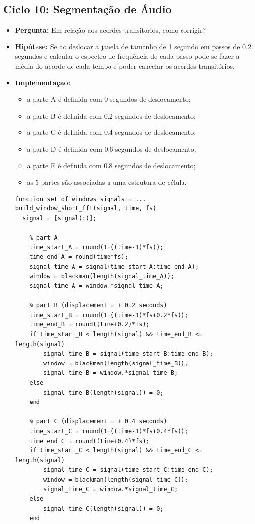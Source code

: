 \subsection{Ciclo 10: Segmentação de Áudio}
\label{subsec:ciclo_10}
\begin{itemize}
\item \textbf{Pergunta:} Em relação aos acordes transitórios, como corrigir?
\item \textbf{Hipótese:} Se ao deslocar a janela de tamanho de 1 segundo em passos de 0.2 segundos e calcular o espectro de frequência de cada passo pode-se fazer a média do acorde de cada tempo e poder cancelar os acordes transitórios.
\item \textbf{Implementação:}
\begin{itemize} 
	\item a parte A é definida com 0 segundos de deslocamento;
	\item a parte B é definida com 0.2 segundos de deslocamento;
	\item a parte C é definida com 0.4 segundos de deslocamento;
	\item a parte D é definida com 0.6 segundos de deslocamento;
	\item a parte E é definida com 0.8 segundos de deslocamento;
	\item as 5 partes são associadas a uma estrutura de célula.
\end{itemize}
\begin{lstlisting}
function set_of_windows_signals = ...
build_window_short_fft(signal, time, fs)
  signal = [signal(:)];

    % part A
    time_start_A = round(1+((time-1)*fs));
    time_end_A = round(time*fs);
    signal_time_A = signal(time_start_A:time_end_A);
    window = blackman(length(signal_time_A));
    signal_time_A = window.*signal_time_A;

    % part B (displacement = + 0.2 seconds)
    time_start_B = round(1+((time-1)*fs+0.2*fs));
    time_end_B = round((time+0.2)*fs);
    if time_start_B < length(signal) && time_end_B <= length(signal)
        signal_time_B = signal(time_start_B:time_end_B);
        window = blackman(length(signal_time_B));
        signal_time_B = window.*signal_time_B;
    else
        signal_time_B(length(signal)) = 0;
    end

    % part C (displacement = + 0.4 seconds)
    time_start_C = round(1+((time-1)*fs+0.4*fs));
    time_end_C = round((time+0.4)*fs);
    if time_start_C < length(signal) && time_end_C <= length(signal)
        signal_time_C = signal(time_start_C:time_end_C);
        window = blackman(length(signal_time_C));
        signal_time_C = window.*signal_time_C;
    else
        signal_time_C(length(signal)) = 0;
    end


\end{lstlisting}
\end{itemize}
